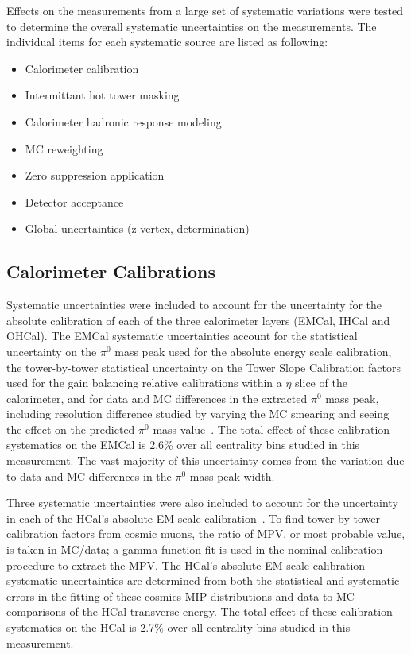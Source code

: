 Effects on the \detdeta measurements from a large set of systematic variations were tested to determine the overall systematic uncertainties on the measurements. 
The individual items for each systematic source are listed as following:
\begin{itemize}
    \item Calorimeter calibration 
    \item Intermittant hot tower masking
    \item Calorimeter hadronic response modeling
    \item MC reweighting
    \item Zero suppression application
    \item Detector acceptance
    \item Global uncertainties (z-vertex, \Npart determination)
\end{itemize}

\subsection{Calorimeter Calibrations}

Systematic uncertainties were included to account for the uncertainty for the absolute calibration of each of the three calorimeter layers (EMCal, IHCal and OHCal). 
The EMCal systematic uncertainties account for the statistical uncertainty on the $\pi^{0}$ mass peak used for the absolute energy scale calibration, the tower-by-tower statistical uncertainty on the Tower Slope Calibration factors used for the gain balancing relative calibrations within a $\eta$ slice of the calorimeter, and for data and MC differences in the extracted $\pi^{0}$ mass peak, including resolution difference studied by varying the MC smearing and seeing the effect on the predicted $\pi^{0}$ mass value~\cite{EMCal_calib_internal_note}.
The total effect of these calibration systematics on the EMCal \detdeta is 2.6\% over all centrality bins studied in this measurement. 
The vast majority of this uncertainty comes from the variation due to data and MC differences in the $\pi^{0}$ mass peak width.

Three systematic uncertainties were also included to account for the uncertainty in each of the HCal's absolute EM scale calibration~\cite{HCal_calib_internal_note}. 
To find tower by tower calibration factors from cosmic muons, the ratio of MPV, or most probable value, is taken in MC/data; 
a gamma function fit is used in the nominal calibration procedure to extract the MPV. 
The HCal's absolute EM scale calibration systematic uncertainties are determined from both the statistical and systematic errors in the fitting of these cosmics MIP distributions and data to MC comparisons of the HCal transverse energy.
The total effect of these calibration systematics on the HCal \detdeta is 2.7\% over all centrality bins studied in this measurement. 

